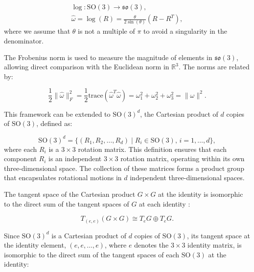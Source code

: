 \begin{equation}
    \begin{aligned}
        \log : \mathrm{SO}(3) \rightarrow \mathfrak{so}(3), \\
        \hat{\omega} = \log(R) = \frac{\theta}{2 \sin(\theta)} (R - R^T),
    \end{aligned}
    \label{eq:log_SO3}
\end{equation}
where we assume that \(\theta\) is not a multiple of \(\pi\) to avoid a singularity in the denominator.


The Frobenius norm is used to measure the magnitude of elements in $\mathfrak{so}(3)$, allowing direct comparison with the Euclidean norm in $\mathbb{R}^3$. The norms are related by:

\begin{equation}
    \frac{1}{2} \|\hat{\omega}\|^2_F = \frac{1}{2}\text{trace}(\hat{\omega}^T \hat{\omega}) = \omega_1^2 + \omega_2^2 + \omega_3^2 = \|\omega\|^2. 
    \label{eq:norm_SO3}
\end{equation}


This framework can be extended to \(\mathrm{SO}(3)^d\), the Cartesian product of \(d\) copies of \(\mathrm{SO}(3)\), defined as:

\begin{equation}
    \mathrm{SO}(3)^d = \{ (R_1, R_2, \dots, R_d) \mid R_i \in \mathrm{SO}(3), \, i=1,\dots,d \},
\end{equation}
where each \(R_i\) is a \(3 \times 3\) rotation matrix. This definition ensures that each component \(R_i\) is an independent \(3 \times 3\) rotation matrix, operating within its own three-dimensional space. The collection of these matrices forms a product group that encapsulates rotational motions in \(d\) independent three-dimensional spaces.

The tangent space of the Cartesian product \(G \times G\) at the identity is isomorphic to the direct sum of the tangent spaces of \(G\) at each identity \cite{leeIntroductionSmoothManifolds2012}: 

\begin{equation}
    T_{(e,e)}(G \times G) \cong T_eG \oplus T_eG.
    \label{eq:tangent-space-product-group}
\end{equation}

Since \(\mathrm{SO}(3)^d\) is a Cartesian product of \(d\) copies of \(\mathrm{SO}(3)\), its tangent space at the identity element, \((e, e, \dots, e)\), where \(e\) denotes the \(3 \times 3\) identity matrix, is isomorphic to the direct sum of the tangent spaces of each \(\mathrm{SO}(3)\) at the identity:

